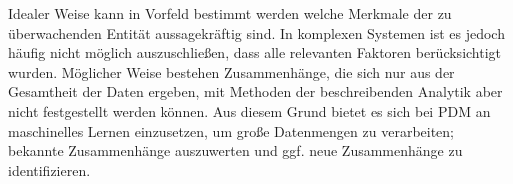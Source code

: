 Idealer Weise kann in Vorfeld bestimmt werden welche Merkmale der zu überwachenden Entität aussagekräftig sind. In komplexen Systemen ist es jedoch häufig nicht möglich auszuschließen, dass alle relevanten Faktoren berücksichtigt wurden. Möglicher Weise bestehen Zusammenhänge, die sich nur aus der Gesamtheit der Daten ergeben, mit Methoden der beschreibenden Analytik aber nicht festgestellt werden können. Aus diesem Grund bietet es sich bei PDM an maschinelles Lernen einzusetzen, um große Datenmengen zu verarbeiten; bekannte Zusammenhänge auszuwerten und ggf. neue Zusammenhänge zu identifizieren.

